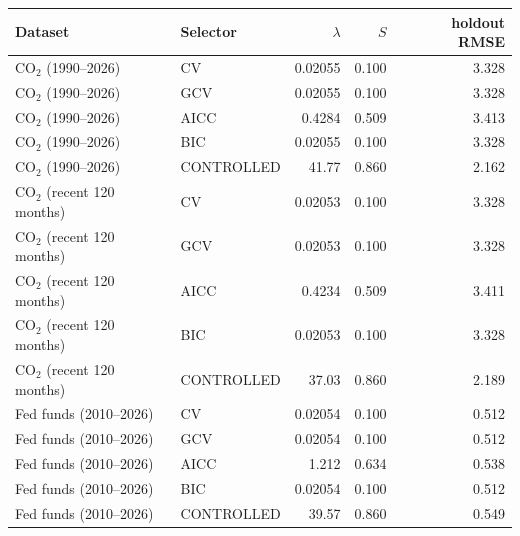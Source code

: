 \begin{tabular}{llrrr}\toprule
Dataset & Selector & $\lambda$ & $S$ & holdout RMSE\\\midrule
CO$_2$ (1990--2026) & CV & 0.02055 & 0.100 & 3.328\\
CO$_2$ (1990--2026) & GCV & 0.02055 & 0.100 & 3.328\\
CO$_2$ (1990--2026) & AICC & 0.4284 & 0.509 & 3.413\\
CO$_2$ (1990--2026) & BIC & 0.02055 & 0.100 & 3.328\\
CO$_2$ (1990--2026) & CONTROLLED & 41.77 & 0.860 & 2.162\\
CO$_2$ (recent 120 months) & CV & 0.02053 & 0.100 & 3.328\\
CO$_2$ (recent 120 months) & GCV & 0.02053 & 0.100 & 3.328\\
CO$_2$ (recent 120 months) & AICC & 0.4234 & 0.509 & 3.411\\
CO$_2$ (recent 120 months) & BIC & 0.02053 & 0.100 & 3.328\\
CO$_2$ (recent 120 months) & CONTROLLED & 37.03 & 0.860 & 2.189\\
Fed funds (2010--2026) & CV & 0.02054 & 0.100 & 0.512\\
Fed funds (2010--2026) & GCV & 0.02054 & 0.100 & 0.512\\
Fed funds (2010--2026) & AICC & 1.212 & 0.634 & 0.538\\
Fed funds (2010--2026) & BIC & 0.02054 & 0.100 & 0.512\\
Fed funds (2010--2026) & CONTROLLED & 39.57 & 0.860 & 0.549\\
\bottomrule\end{tabular}
